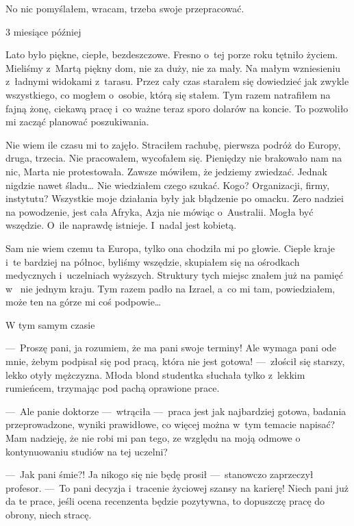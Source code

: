 No nic pomyślałem, wracam, trzeba swoje przepracować.

\begin{paratitle}
3 miesiące później
\end{paratitle}

Lato było piękne, ciepłe, bezdeszczowe. Fresno o~tej porze roku tętniło życiem. Mieliśmy z~Martą piękny dom, nie za 
duży, nie za mały. Na małym wzniesieniu z~ładnymi widokami z~tarasu. Przez cały czas starałem się dowiedzieć jak 
zwykle wszystkiego, co mogłem o~osobie, którą się stałem. Tym razem natrafiłem na fajną żonę, ciekawą pracę i~co 
ważne teraz sporo dolarów na koncie. To pozwoliło mi zacząć planować poszukiwania.

\paraSep

Nie wiem ile czasu mi to zajęło. Straciłem rachubę, pierwsza podróż do Europy, druga, trzecia. Nie pracowałem, 
wycofałem się. Pieniędzy nie brakowało nam na nic, Marta nie protestowała. Zawsze mówiłem, że jedziemy zwiedzać. 
Jednak nigdzie nawet śladu… Nie wiedziałem czego szukać. Kogo? Organizacji, firmy, instytutu? Wszystkie moje 
działania były jak błądzenie po omacku. Zero nadziei na powodzenie, jest cała Afryka, Azja nie mówiąc o~Australii. 
Mogła być wszędzie. O~ile naprawdę istnieje. I~nadal jest kobietą.

\paraSep

Sam nie wiem czemu ta Europa, tylko ona chodziła mi po głowie. Ciepłe kraje i~te bardziej na północ, byliśmy 
wszędzie, skupiałem się na ośrodkach medycznych i~uczelniach wyższych. Struktury tych miejsc znałem już na pamięć w~
nie jednym kraju. Tym razem padło na Izrael, a~co mi tam, powiedziałem, może ten na górze mi coś podpowie…

\begin{paratitle}
W tym samym czasie
\end{paratitle}

---~Proszę pani, ja rozumiem, że ma pani swoje terminy! Ale wymaga pani ode mnie, żebym podpisał się pod pracą, która 
nie jest gotowa! ---~złościł się starszy, lekko otyły mężczyzna. Młoda blond studentka słuchała tylko z~lekkim 
rumieńcem, trzymając pod pachą oprawione prace. 

---~Ale panie doktorze ---~wtrąciła ---~praca jest jak najbardziej gotowa, badania przeprowadzone, wyniki prawidłowe, 
co więcej można w~tym temacie napisać? Mam nadzieję, że nie robi mi pan tego, ze względu na moją odmowe o~
kontynuowaniu studiów na tej uczelni?

---~Jak pani śmie?! Ja nikogo się nie będę prosił ---~stanowczo zaprzeczył profesor. ---~To pani decyzja i~tracenie 
życiowej szansy na karierę! Niech pani już da te prace, jeśli ocena recenzenta będzie pozytywna, to dopuszczę pracę 
do obrony, niech stracę.

